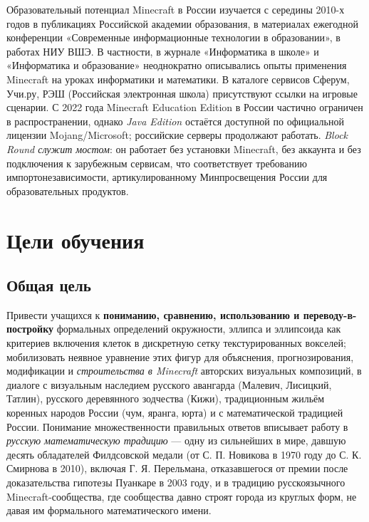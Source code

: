 \documentclass[12pt,a4paper]{scrartcl}
\newcommand{\acc}[1]{\textcolor{accent}{\textbf{#1}}}
\begin{document}
\begin{minecraft}
Образовательный потенциал Minecraft в России изучается с середины 2010-х годов в публикациях Российской академии образования, в материалах ежегодной конференции «Современные информационные технологии в образовании», в работах НИУ ВШЭ. В частности, в журнале «Информатика в школе» и «Информатика и образование» неоднократно описывались опыты применения Minecraft на уроках информатики и математики. В каталоге сервисов Сферум, Учи.ру, РЭШ (Российская электронная школа) присутствуют ссылки на игровые сценарии. С 2022 года Minecraft Education Edition в России частично ограничен в распространении, однако \emph{Java Edition} остаётся доступной по официальной лицензии Mojang/Microsoft; российские серверы продолжают работать. \emph{Block Round служит мостом}: он работает без установки Minecraft, без аккаунта и без подключения к зарубежным сервисам, что соответствует требованию импортонезависимости, артикулированному Минпросвещения России для образовательных продуктов.
\end{minecraft}

\section{Цели обучения}\label{sec:objetivos}

\subsection{Общая цель}

Привести учащихся к \acc{пониманию, сравнению, использованию и переводу-в-постройку} формальных определений окружности, эллипса и эллипсоида как критериев включения клеток в дискретную сетку текстурированных вокселей; мобилизовать неявное уравнение этих фигур для объяснения, прогнозирования, модификации и \emph{строительства в Minecraft} авторских визуальных композиций, в диалоге с визуальным наследием русского авангарда (Малевич, Лисицкий, Татлин), русского деревянного зодчества (Кижи), традиционным жильём коренных народов России (чум, яранга, юрта) и с математической традицией России. Понимание множественности правильных ответов вписывает работу в \emph{русскую математическую традицию} --- одну из сильнейших в мире, давшую десять обладателей Филдсовской медали (от С. П. Новикова в 1970 году до С. К. Смирнова в 2010), включая Г. Я. Перельмана, отказавшегося от премии после доказательства гипотезы Пуанкаре в 2003 году, и в традицию русскоязычного Minecraft-сообщества, где сообщества давно строят города из круглых форм, не давая им формального математического имени.
\end{document}
